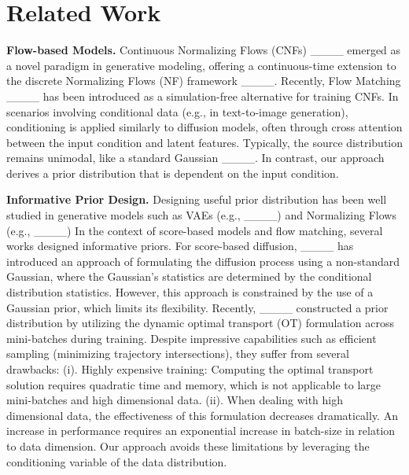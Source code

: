 \section{Related Work}
\noindent \textbf{Flow-based Models.} \quad
Continuous Normalizing Flows (CNFs) ____ emerged as a novel paradigm in generative modeling, offering a continuous-time extension to the discrete Normalizing Flows (NF) framework ____. 
Recently, Flow Matching ____ has been introduced as a simulation-free alternative for training CNFs.
In scenarios involving conditional data (e.g., in text-to-image generation), conditioning is applied similarly to diffusion models, often through cross attention between the input condition and latent features. Typically, the source distribution remains unimodal, like a standard Gaussian ____. In contrast, our approach derives a prior distribution that is dependent on the input condition.





\noindent \textbf{Informative Prior Design.} \quad
Designing useful prior distribution has been well studied in generative models such as VAEs (e.g., ____) and Normalizing Flows (e.g., ____)
In the context of score-based models and flow matching, several works designed informative priors. 
For score-based diffusion, ____ has introduced an approach of formulating the diffusion process using a non-standard Gaussian, where the Gaussian's statistics are determined by the conditional distribution statistics. 
However, this approach is constrained by the use of a Gaussian prior, which limits its flexibility.
Recently, ____ constructed a prior distribution by utilizing the dynamic optimal transport (OT) formulation across mini-batches during training. Despite impressive capabilities such as efficient sampling (minimizing trajectory intersections), they suffer from several drawbacks: (i). Highly expensive training: Computing the optimal transport solution requires quadratic time and memory, which is not applicable to large mini-batches and high dimensional data. (ii). When dealing with high dimensional data, the effectiveness of this formulation decreases dramatically. An increase in performance requires an exponential increase in batch-size in relation to data dimension. 
Our approach avoids these limitations by leveraging the conditioning variable of the data distribution.